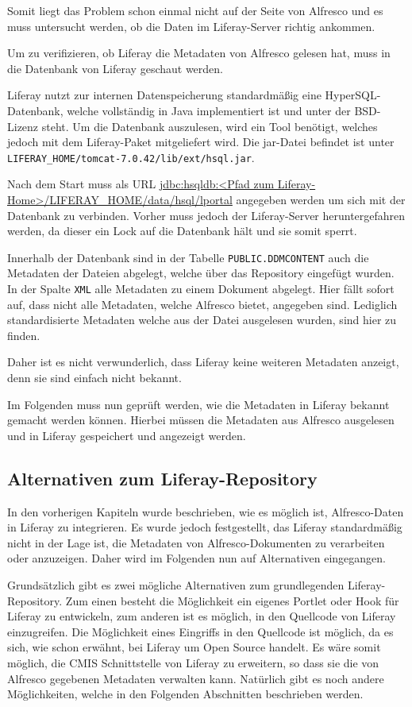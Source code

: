 Somit liegt das Problem schon einmal nicht auf der Seite von Alfresco und es muss untersucht werden, ob die Daten im Liferay-Server richtig ankommen.

Um zu verifizieren, ob Liferay die Metadaten von Alfresco gelesen hat, muss in die Datenbank von Liferay geschaut werden.

Liferay nutzt zur internen Datenspeicherung standardm\"a\ss{}ig eine HyperSQL-Datenbank, welche vollst\"andig in Java implementiert ist und unter der BSD-Lizenz steht. Um die Datenbank auszulesen, wird ein Tool ben\"otigt, welches jedoch mit dem Liferay-Paket mitgeliefert wird. Die jar-Datei befindet ist unter \texttt{LIFERAY\_HOME/tomcat-7.0.42/lib/ext/hsql.jar}.

Nach dem Start muss als URL \url{jdbc:hsqldb:<Pfad zum Liferay-Home>/LIFERAY\_HOME/data/hsql/lportal} angegeben werden um sich mit der Datenbank zu verbinden. Vorher muss jedoch der Liferay-Server heruntergefahren werden, da dieser ein Lock auf die Datenbank h\"alt und sie somit sperrt.

Innerhalb der Datenbank sind in der Tabelle \texttt{PUBLIC.DDMCONTENT} auch die Metadaten der Dateien abgelegt, welche \"uber das Repository eingef\"ugt wurden. In der Spalte \texttt{XML} alle Metadaten zu einem Dokument abgelegt. Hier f\"allt sofort auf, dass nicht alle Metadaten, welche Alfresco bietet, angegeben sind. Lediglich standardisierte Metadaten welche aus der Datei ausgelesen wurden, sind hier zu finden. 

Daher ist es nicht verwunderlich, dass Liferay keine weiteren Metadaten anzeigt, denn sie sind einfach nicht bekannt.

Im Folgenden muss nun gepr\"uft werden, wie die Metadaten in Liferay bekannt gemacht werden k\"onnen. Hierbei m\"ussen die Metadaten aus Alfresco ausgelesen und in Liferay gespeichert und angezeigt werden.

\subsection{Alternativen zum Liferay-Repository}
In den vorherigen Kapiteln wurde beschrieben, wie es m\"oglich ist, Alfresco-Daten in Liferay zu integrieren. Es wurde jedoch festgestellt, das Liferay standardm\"a\ss{}ig nicht in der Lage ist, die Metadaten von Alfresco-Dokumenten zu verarbeiten oder anzuzeigen. Daher wird im Folgenden nun auf Alternativen eingegangen.

Grunds\"atzlich gibt es zwei m\"ogliche Alternativen zum grundlegenden Liferay-Repository. Zum einen besteht die M\"oglichkeit ein eigenes Portlet oder Hook f\"ur Liferay zu entwickeln, zum anderen ist es m\"oglich, in den Quellcode von Liferay einzugreifen. Die M\"oglichkeit eines Eingriffs in den Quellcode ist m\"oglich, da es sich, wie schon erw\"ahnt, bei Liferay um Open Source handelt. Es w\"are somit m\"oglich, die \ac{CMIS} Schnittstelle von Liferay zu erweitern, so dass sie die von Alfresco gegebenen Metadaten verwalten kann. Nat\"urlich gibt es noch andere M\"oglichkeiten, welche in den Folgenden Abschnitten beschrieben werden.

